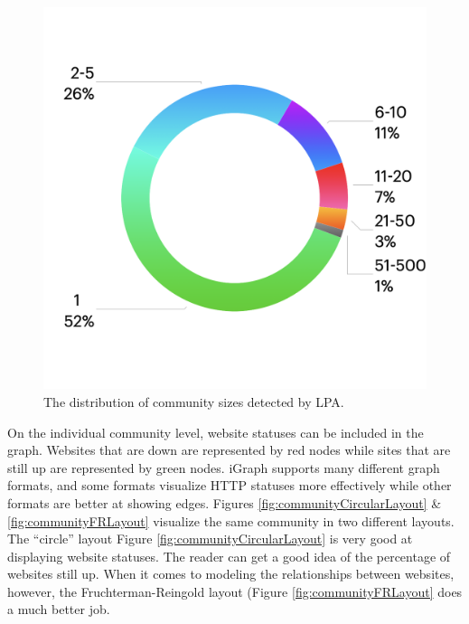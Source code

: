 \documentclass[conference]{IEEEtran}
\begin{document}
\begin{figure}[htbp]
 \centerline{\includegraphics[width=\columnwidth]{CommunitySizeDistribution.png}}
 \caption{The distribution of community sizes detected by LPA.}
 \label{fig:communitySizeDistribution}
\end{figure}

On the individual community level, website statuses can be included in the graph. Websites that are down are represented by red nodes while sites that are still up are represented by green nodes. iGraph supports many different graph formats, and some formats visualize HTTP statuses more effectively while other formats are better at showing edges. Figures \ref{fig:communityCircularLayout} \& \ref{fig:communityFRLayout} visualize the same community in two different layouts. The “circle” layout Figure \ref{fig:communityCircularLayout} is very good at displaying website statuses. The reader can get a good idea of the percentage of websites still up. When it comes to modeling the relationships between websites, however, the Fruchterman-Reingold layout \cite{fruchterman1991graph}(Figure \ref{fig:communityFRLayout} does a much better job.
\end{document}
